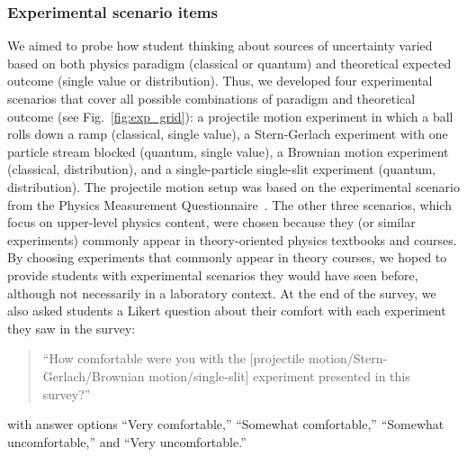 \documentclass[english,aps,prstper,reprint,showpacs,longbibliography,superscriptaddress,nofootinbib]{revtex4-2}
\begin{document}
\subsubsection{Experimental scenario items}
We aimed to probe how student thinking about sources of uncertainty varied based on both physics paradigm (classical or quantum) and theoretical expected outcome (single value or distribution). Thus, we developed four experimental scenarios that cover all possible combinations of paradigm and theoretical outcome (see Fig.~\ref{fig:exp_grid}): a projectile motion experiment in which a ball rolls down a ramp (classical, single value), a Stern-Gerlach experiment with one particle stream blocked (quantum, single value), a Brownian motion experiment (classical, distribution), and a single-particle single-slit experiment (quantum, distribution). The projectile motion setup was based on the experimental scenario from the Physics Measurement Questionnaire~\cite{Allie1998}. The other three scenarios, which focus on upper-level physics content, were chosen because they (or similar experiments) commonly appear in theory-oriented physics textbooks and courses. 
By choosing experiments that commonly appear in theory courses, we hoped to provide students with experimental scenarios they would have seen before, although not necessarily in a laboratory context. At the end of the survey, we also asked students a Likert question about their comfort with each experiment they saw in the survey: 
\begin{quote}
``How comfortable were you with the [projectile motion/Stern-Gerlach/Brownian motion/single-slit] experiment presented in this survey?''
\end{quote}
with answer options ``Very comfortable,'' ``Somewhat comfortable,'' ``Somewhat uncomfortable,'' and ``Very uncomfortable.''
\end{document}
